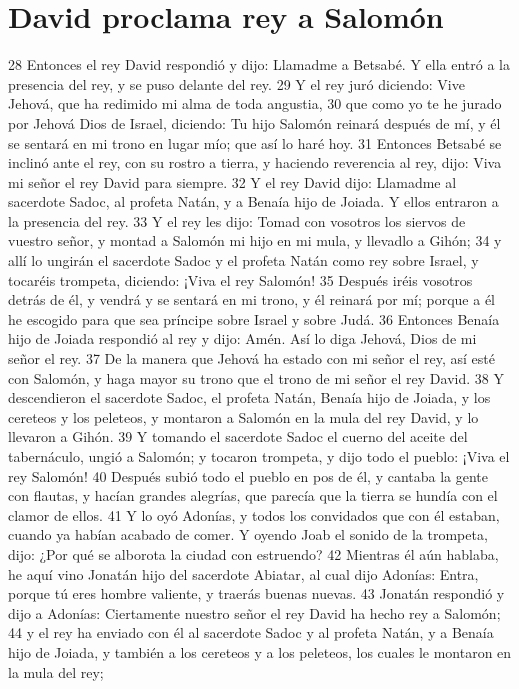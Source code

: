 \section*{David proclama rey a Salomón}

28 Entonces el rey David respondió y dijo: Llamadme a Betsabé. Y ella entró a la presencia del rey, y se puso delante del rey.
29 Y el rey juró diciendo: Vive Jehová, que ha redimido mi alma de toda angustia,
30 que como yo te he jurado por Jehová Dios de Israel, diciendo: Tu hijo Salomón reinará después de mí, y él se sentará en mi trono en lugar mío; que así lo haré hoy.
31 Entonces Betsabé se inclinó ante el rey, con su rostro a tierra, y haciendo reverencia al rey, dijo: Viva mi señor el rey David para siempre.
32 Y el rey David dijo: Llamadme al sacerdote Sadoc, al profeta Natán, y a Benaía hijo de Joiada. Y ellos entraron a la presencia del rey.
33 Y el rey les dijo: Tomad con vosotros los siervos de vuestro señor, y montad a Salomón mi hijo en mi mula, y llevadlo a Gihón;
34 y allí lo ungirán el sacerdote Sadoc y el profeta Natán como rey sobre Israel, y tocaréis trompeta, diciendo: ¡Viva el rey Salomón!
35 Después iréis vosotros detrás de él, y vendrá y se sentará en mi trono, y él reinará por mí; porque a él he escogido para que sea príncipe sobre Israel y sobre Judá.
36 Entonces Benaía hijo de Joiada respondió al rey y dijo: Amén. Así lo diga Jehová, Dios de mi señor el rey.
37 De la manera que Jehová ha estado con mi señor el rey, así esté con Salomón, y haga mayor su trono que el trono de mi señor el rey David.
38 Y descendieron el sacerdote Sadoc, el profeta Natán, Benaía hijo de Joiada, y los cereteos y los peleteos, y montaron a Salomón en la mula del rey David, y lo llevaron a Gihón.
39 Y tomando el sacerdote Sadoc el cuerno del aceite del tabernáculo, ungió a Salomón; y tocaron trompeta, y dijo todo el pueblo: ¡Viva el rey Salomón!
40 Después subió todo el pueblo en pos de él, y cantaba la gente con flautas, y hacían grandes alegrías, que parecía que la tierra se hundía con el clamor de ellos.
41 Y lo oyó Adonías, y todos los convidados que con él estaban, cuando ya habían acabado de comer. Y oyendo Joab el sonido de la trompeta, dijo: ¿Por qué se alborota la ciudad con estruendo?
42 Mientras él aún hablaba, he aquí vino Jonatán hijo del sacerdote Abiatar, al cual dijo Adonías: Entra, porque tú eres hombre valiente, y traerás buenas nuevas.
43 Jonatán respondió y dijo a Adonías: Ciertamente nuestro señor el rey David ha hecho rey a Salomón;
44 y el rey ha enviado con él al sacerdote Sadoc y al profeta Natán, y a Benaía hijo de Joiada, y también a los cereteos y a los peleteos, los cuales le montaron en la mula del rey;
